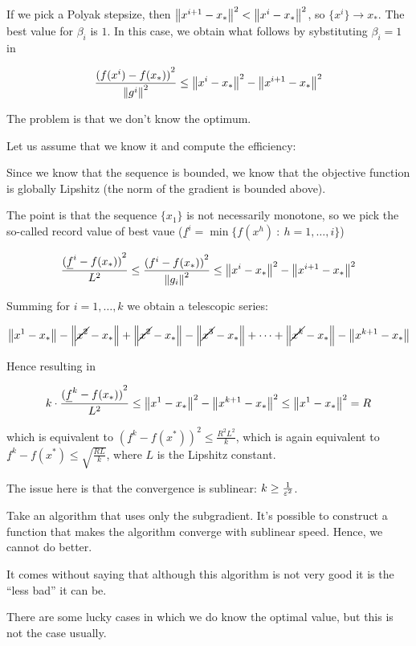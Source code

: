 \documentclass[ComputationalMathematics.tex]{subfiles}
\begin{document}
If we pick a Polyak stepsize, then ${\left\lVert x^{i+1} - x_*\right\rVert}^2 < {\left\lVert x^i  - x_*\right\rVert}^2$, so $\{x^i \} \to x_*$.
The best value for $\beta_i$ is $1$.
In this case, we obtain what follows by sybstituting $\beta_i = 1$ in 

\[
  \frac{{(f(x^i) - f(x_*))}^2}{{\left\lVert g^i\right\rVert}^2} \le {\left\lVert x^i - x_*\right\rVert}^2 - {\left\lVert x^{i+1} - x_*\right\rVert}^2
\]

The problem is that we don't know the optimum.

Let us assume that we know it and compute the efficiency:

Since we know that the sequence is bounded, we know that the objective function is globally Lipshitz (the norm of the gradient is bounded above).

The point is that the sequence $\{ x_1 \}$ is not necessarily monotone, so we pick the so-called record value of best vaue ($\underline{f}^i = \min \{ f(x^h)~:~h=1, \ldots, i\}$)

\[
  \frac{{(\underline{f}^i - f(x_*))}^2}{L^2} \le \frac{{({f}^i - f(x_*))}^2}{{\left\lVert g_i\right\rVert}^2} \le {\left\lVert x^i - x_*\right\rVert}^2 - {\left\lVert x^{i+1} - x_*\right\rVert}^2
\]

Summing for $i=1, \ldots, k$ we obtain a telescopic series:

\[
  \left\lVert x^1 - x_*\right\rVert - \left\lVert\cancel{x^2} - x_*\right\rVert + \left\lVert\cancel{x^2} - x_*\right\rVert - \left\lVert\cancel{x^3} - x_*\right\rVert + \cdots + \left\lVert\cancel{x^k} - x_*\right\rVert - \left\lVert x^{k+1} - x_*\right\rVert
\]

Hence resulting in

\[
  k \cdot \frac{{(\underline{f}^k - f(x_*))}^2}{L^2} \le {\left\lVert x^1 - x_*\right\rVert}^2 - {\left\lVert x^{k+1} - x_*\right\rVert}^2 \le {\left\lVert x^1 - x_*\right\rVert}^2 = R
\]

which is equivalent to ${(\underline{f}^k - f(x^*))}^2 \le \frac{R^2L^2}{k}$, which is again equivalent to $\underline{f}^k - f(x^*) \le \sqrt{\frac{RL}{k}}$, where $L$ is the Lipshitz constant.

The issue here is that the convergence is sublinear: $k \ge \frac{1}{{\varepsilon}^2}$.


\begin{theorem}
Take an algorithm that uses only the subgradient. It's possible to construct a function that makes the algorithm converge with sublinear speed.
Hence, we cannot do better.
\end{theorem}

It comes without saying that although this algorithm is not very good it is the ``less bad'' it can be.

There are some lucky cases in which we do know the optimal value, but this is not the case usually.
\end{document}
